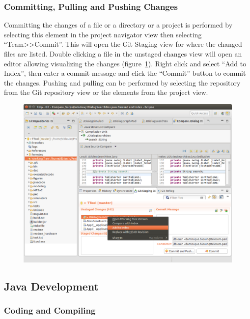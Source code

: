 \documentclass[12pt]{article}
\begin{document}
\subsubsection{Committing, Pulling and Pushing Changes}

Committing the changes of a file or a directory or a project is performed by
selecting this element in the project navigator view then selecting
``Team>>Commit''. This will open the Git Staging view for where the changed
files are listed. Double clicking a file in the unstaged changes view will open
an editor allowing visualizing the changes (figure~\ref{fig:image7}). Right click and select
``Add to Index'', then enter a commit message and click the ``Commit'' button to
commit the changes. Pushing and pulling can be performed by selecting the repository from
the Git repository view or the elements from the project view.

\begin{figure}[H]
\begin{center}
\includegraphics[width=\textwidth]{images/image7.png}
\end{center}
\caption{}
\label{fig:image7}
\end{figure}

\subsection{Java Development}

\subsubsection{Coding and Compiling}
\end{document}
